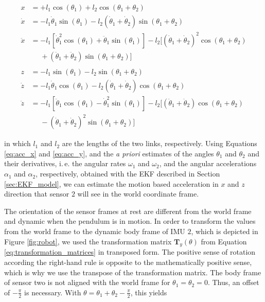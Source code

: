 \begin{align}
  x &= + l_1 \cos(\theta_1) + l_2 \cos(\theta_1 + \theta_2) \\
  \dot{x} &= -l_1 \dot{\theta}_1 \sin(\theta_1) - l_2 (\dot{\theta}_1 + \dot{\theta}_2) \sin(\theta_1 + \theta_2) \\
  \ddot{x} &= -l_1 [\dot{\theta}^2_1 \cos(\theta_1) + \ddot{\theta}_1 \sin(\theta_1)] - l_2 [(\dot{\theta}_1 + \dot{\theta}_2)^2 \cos(\theta_1 + \theta_2) \nonumber \\ 
  &\mathrel{\phantom{=}} + (\ddot{\theta}_1 + \ddot{\theta}_2) \sin(\theta_1 + \theta_2)] \label{eq:acc_x} \\
  \nonumber \\
  z &= -l_1 \sin(\theta_1) - l_2 \sin(\theta_1 + \theta_2) \\
  \dot{z} &= -l_1 \dot{\theta}_1 \cos(\theta_1) - l_2 (\dot{\theta}_1 + \dot{\theta}_2) \cos(\theta_1 + \theta_2) \\
  \ddot{z} {}&= -l_1 [\ddot{\theta}_1 \cos(\theta_1) - \dot{\theta}^2_1 \sin(\theta_1)] - l_2 [(\ddot{\theta}_1 + \ddot{\theta}_2) \cos(\theta_1 + \theta_2) \nonumber \\ 
  &\mathrel{\phantom{=}} - (\dot{\theta}_1 + \dot{\theta}_2)^2 \sin(\theta_1 + \theta_2)] \label{eq:acc_y}
\end{align}

\noindent
in which $l_1$ and $l_2$ are the lengths of the two links, respectively. Using Equations \ref{eq:acc_x} and \ref{eq:acc_y}, and the \emph{a priori} estimates of the angles $\theta_1$ and $\theta_2$ and their derivatives, i.\,e. the angular rates $\omega_1$ and $\omega_2$, and the angular accelerations $\alpha_1$ and $\alpha_2$, respectively, obtained with the EKF described in Section \ref{sec:EKF_model}, we can estimate the motion based acceleration in $x$ and $z$ direction that sensor $2$ will see in the world coordinate frame.

The orientation of the sensor frames at rest are different from the world frame and dynamic when the pendulum is in motion. In order to transform the values from the world frame to the dynamic body frame of \gls{IMU} $2$, which is depicted in Figure \ref{fig:robot}, we used the transformation matrix $\mathbf{T}_y(\theta)$ from Equation \ref{eq:transformation_matrices} in transposed form. The positive sense of rotation according the right-hand rule is opposite to the mathematically positive sense, which is why we use the transpose of the transformation matrix. The body frame of sensor two is not aligned with the world frame for $\theta_1 = \theta_2 = 0$. Thus, an offset of $-\frac{\pi}{2}$ is necessary. With $\theta = \theta_1 + \theta_2 - \frac{\pi}{2}$, this yields

